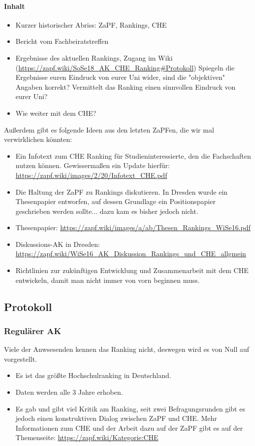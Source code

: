     \paragraph{Inhalt}
      \begin{itemize}
        \item Kurzer historischer Abriss: ZaPF, Rankings, CHE
        \item Bericht vom Fachbeiratstreffen
        \item Ergebnisse des aktuellen Rankings, Zugang im Wiki (\url{https://zapf.wiki/SoSe18_AK_CHE_Ranking#Protokoll})
        Spiegeln die Ergebnisse euren Eindruck von eurer Uni wider, sind die "objektiven" Angaben korrekt?
        Vermittelt das Ranking einen sinnvollen Eindruck von eurer Uni?
        \item Wie weiter mit dem CHE?
      \end{itemize}
      Außerdem gibt es folgende Ideen aus den letzten ZaPFen, die wir mal verwirklichen könnten:
      \begin{itemize}
        \item Ein Infotext zum CHE Ranking für Studieninteressierte, den die Fachschaften nutzen können. Gewissermaßen ein Update hierfür: \url{https://zapf.wiki/images/2/20/Infotext_CHE.pdf}
        \item Die Haltung der ZaPF zu Rankings diskutieren. In Dresden wurde ein Thesenpapier entworfen, auf dessen Grundlage ein Positionspapier geschrieben werden sollte... dazu kam es bisher jedoch nicht.
        \item Thesenpapier: \url{https://zapf.wiki/images/a/ab/Thesen_Rankings_WiSe16.pdf}
        \item Diskussions-AK in Dresden: \url{https://zapf.wiki/WiSe16_AK_Diskussion_Rankings_und_CHE_allgmein}
        \item Richtlinien zur zukünftigen Entwicklung und Zusammenarbeit mit dem CHE entwickeln, damit man nicht immer von vorn beginnen muss.
      \end{itemize}

  \subsection*{Protokoll}
    \subsubsection*{Regulärer AK}
      Viele der Anwsesenden kennen das Ranking nicht, deswegen wird es von Null auf vorgestellt.
        \begin{itemize}
          \item Es ist das größte Hochschulranking in Deutschland.
          \item Daten werden alle 3 Jahre erhoben.
          \item Es gab und gibt viel Kritik am Ranking, seit zwei Befragungsrunden gibt es jedoch einen konstruktiven Dialog zwischen ZaPF und CHE. Mehr Informationen zum CHE und der Arbeit dazu auf der ZaPF gibt es auf der Themenseite: \url{https://zapf.wiki/Kategorie:CHE}
        \end{itemize}

